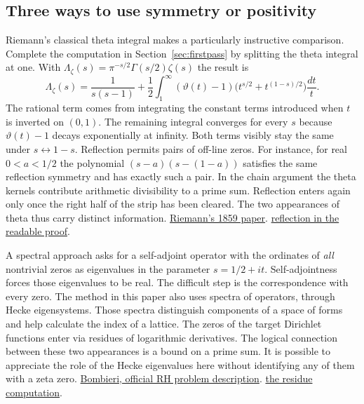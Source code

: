 \documentclass[11pt,letterpaper]{article}
\newcommand{\sref}[2]{\href{https://github.com/VladimirReshetnikov/ProveIt/blob/d8415e76ad850651f8c0083afe689dd9f4a45a10/Analysis/GeneralizedRiemannHypothesis/vendor/grh-lean/grh/src/#1.lean}{#2}}
\begin{document}
\subsection{Three ways to use symmetry or positivity}

Riemann's classical theta integral makes a particularly instructive comparison. Complete the computation in Section~\ref{sec:firstpass} by splitting the theta integral at one. With \(\Lambda_\zeta(s)=\pi^{-s/2}\Gamma(s/2)\zeta(s)\) the result is
\[
 \Lambda_\zeta(s)
 =\frac{1}{s(s-1)}
 +\frac12\int_1^\infty (\vartheta(t)-1)
           \bigl(t^{s/2}+t^{(1-s)/2}\bigr)\frac{dt}{t}.
\]
The rational term comes from integrating the constant terms introduced when \(t\) is inverted on \((0,1)\). The remaining integral converges for every \(s\) because \(\vartheta(t)-1\) decays exponentially at infinity. Both terms visibly stay the same under \(s\leftrightarrow1-s\). Reflection permits pairs of off-line zeros. For instance, for real \(0<a<1/2\) the polynomial \((s-a)(s-(1-a))\) satisfies the same reflection symmetry and has exactly such a pair. In the chain argument the theta kernels contribute arithmetic divisibility to a prime sum. Reflection enters again only once the right half of the strip has been cleared. The two appearances of theta thus carry distinct information. \href{https://www.claymath.org/collections/riemanns-1859-manuscript/}{Riemann's 1859 paper}. \sref{New/Main}{reflection in the readable proof}.

A spectral approach asks for a self-adjoint operator with the ordinates of \emph{all} nontrivial zeros as eigenvalues in the parameter \(s=1/2+it\). Self-adjointness forces those eigenvalues to be real. The difficult step is the correspondence with every zero. The method in this paper also uses spectra of operators, through Hecke eigensystems. Those spectra distinguish components of a space of forms and help calculate the index of a lattice. The zeros of the target Dirichlet functions enter via residues of logarithmic derivatives. The logical connection between these two appearances is a bound on a prime sum. It is possible to appreciate the role of the Hecke eigenvalues here without identifying any of them with a zeta zero. \href{https://www.claymath.org/library/monographs/MPPc.pdf}{Bombieri, official RH problem description}. \sref{New/Reduction/Zeros/PrimeError}{the residue computation}.
\end{document}
